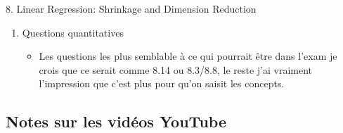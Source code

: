 \documentclass[12pt, titlepage, french]{report}
\begin{document}
\begin{CHPT_SUMM}[label = {VALID-SHRINKAGE}]{8. Linear Regression:  Shrinkage and Dimension Reduction}
\begin{enumerate}
	\begin{itemize}
		\item	Les questions d'exam semblaient être  +/- juste ça;
		\item	Bien saisir le lien avec le SSE et les différentes méthodes de régression;
		\item	Savoir et comprendre le lien entre le budget alloué $s$ et $\lambda$;
		\item	Savoir et comprendre la distinction entre PCA et PLS.
	\end{itemize}
	\item	Questions quantitatives
	\begin{itemize}
		\item	Les questions les plus semblable à ce qui pourrait être dans l'exam je crois que ce serait comme 8.14 ou 8.3/8.8, le reste j'ai vraiment l'impression que c'est plus pour qu'on saisit les concepts.
	\end{itemize}
\end{enumerate}
\end{CHPT_SUMM}

\subsection{Notes sur les vidéos YouTube}
\end{document}
